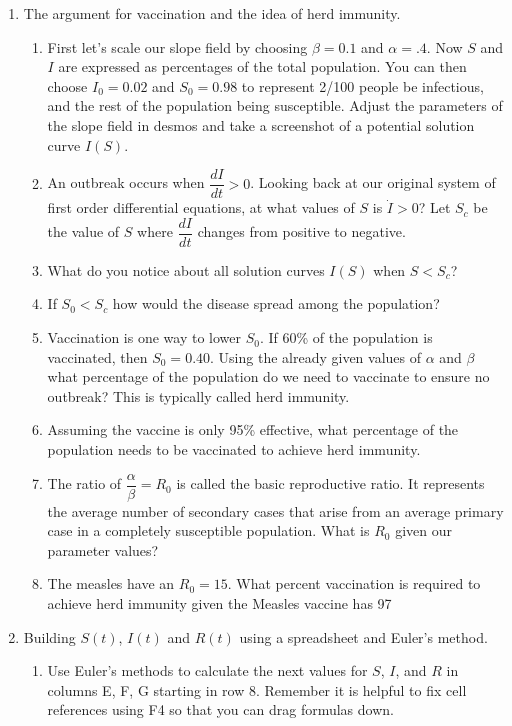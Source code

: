 \documentclass{amsbook}
\begin{document}
\begin{enumerate}
\begin{enumerate}
	\end{enumerate}
	\item The argument for vaccination and the idea of herd immunity.
	\begin{enumerate}
		\item First let's scale our slope field by choosing $\beta = 0.1$ and $\alpha = .4$. Now $S$ and $I$ are expressed as percentages of the total population. You can then choose $I_0=0.02$ and $S_0=0.98$ to represent 2/100 people be infectious, and the rest of the population being susceptible. Adjust the parameters of the slope field in desmos and take a screenshot of a potential solution curve $I(S)$.
		\item An outbreak occurs when $\dfrac{dI}{dt}>0$. Looking back at our original system of first order differential equations, at what values of $S$ is $\dot{I}>0$? Let $S_c$ be the value of $S$ where $\dfrac{dI}{dt}$ changes from positive to negative.
		\item What do you notice about all solution curves $I(S)$ when $S< S_c$?
		\item If $S_0 < S_c$ how would the disease spread among the population?
		\item Vaccination is one way to lower $S_0$. If 60\% of the population is vaccinated, then $S_0 =0.40$. Using the already given values of $\alpha$ and $\beta$ what percentage of the population do we need to vaccinate to ensure no outbreak? This is typically called herd immunity.
		\item Assuming the vaccine is only 95\% effective, what percentage of the population needs to be vaccinated to achieve herd immunity.
		\item The ratio of $\dfrac{\alpha}{\beta}=R_0$ is called the basic reproductive ratio. It represents the average number of secondary cases that arise from an average primary case in a completely susceptible population. What is $R_0$ given our parameter values?
		\item The measles have an $R_0 = 15$. What percent vaccination is required to achieve herd immunity given the Measles vaccine has 97%
	\end{enumerate} 
	\item Building $S(t)$, $I(t)$ and $R(t)$ using a spreadsheet and Euler's method.
		\begin{enumerate}
			\item Use Euler's methods to calculate the next values for $S$, $I$, and $R$ in columns E, F, G starting in row 8. Remember it is helpful to fix cell references using F4 so that you can drag formulas down.

\end{enumerate}
\end{enumerate}
\end{document}

